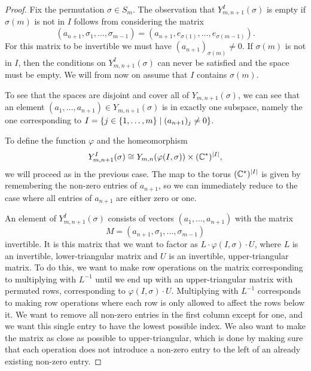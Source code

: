 \begin{proof}
  Fix the permutation $\sigma \in S_m$. The observation that
  $Y^I_{m,n+1}(\sigma)$ is empty 
  if $\sigma(m)$ is not in $I$ follows from considering the matrix
  \[ (a_{n+1},\sigma_1,\dots,\sigma_{m-1}) =
  (a_{n+1},e_{\sigma(1)},\dots,e_{\sigma(m-1)}). \]
  For this matrix to be invertible we must have $(a_{n+1})_{\sigma(m)}
  \neq 0$. If $\sigma(m)$ is not in $I$, then the conditions on
  $Y^{I}_{m,n+1}(\sigma)$ can never be satisfied and the space must be
  empty. We will from now on assume that $I$ contains $\sigma(m)$.
  
  To see that the spaces are disjoint and cover all of
  $Y_{m,n+1}(\sigma)$, we can see that an element
  $(a_1,\dots,a_{n+1})\in Y_{m,n+1}(\sigma)$ is in exactly one
  subspace, namely the one corresponding to $I = \left\{  j \in
    \left\{ 1,\dots,m \right\} \mid (a_{n+1})_j \neq 0 \right\}$.
  
  To define the function $\varphi$ and the homeomorphism
  \[ Y^I_{m,n+1}(\sigma) \cong Y_{m,n}(\varphi(I,\sigma))\times
  (\mathbb{C}^*)^{\left| I \right|}, \]
  we will proceed as in the previous case. The map to the torus
  $(\mathbb{C}^*)^{\left| I \right|}$ is given by remembering the non-zero entries of
  $a_{n+1}$, so we can immediately reduce to the case where all
  entries of $a_{n+1}$ are either zero or one.

  An element of $Y_{m,n+1}^I(\sigma)$ consists of vectors
  $(a_1,\dots,a_{n+1})$ with the matrix
  \[ M = (a_{n+1},\sigma_1,\dots,\sigma_{m-1}) \]
  invertible. It is this matrix that we want to factor as
  $L\cdot \varphi(I,\sigma)\cdot U$, where $L$ is an invertible,
  lower-triangular matrix and $U$ is an invertible, upper-triangular
  matrix. To do this, we want to make row operations on the matrix
  corresponding to multiplying with $L^{-1}$ until we end up with an
  upper-triangular matrix with permuted rows, corresponding to
  $\varphi(I,\sigma) \cdot U$. Multiplying with $L^{-1}$ corresponds
  to making row operations where each row is only allowed to affect
  the rows below it. We want to remove all non-zero entries in the
  first column except for one, and we want this single entry to have
  the lowest possible index. We also want to make the matrix as close
  as possible to upper-triangular, which is done by making sure that
  each operation does not introduce a non-zero entry to the left of an
  already existing non-zero entry.
  

\end{proof}
